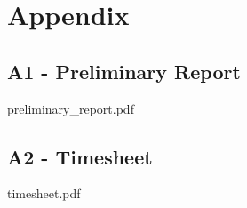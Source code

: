 \documentclass[../main.tex]{subfiles}
\begin{document}
\renewcommand{\baselinestretch}{1.5}
\newpage\section*{Appendix}
\subsection*{A1 - Preliminary Report}
preliminary\_report.pdf
%

\subsection*{A2 - Timesheet}
timesheet.pdf


\end{document}
